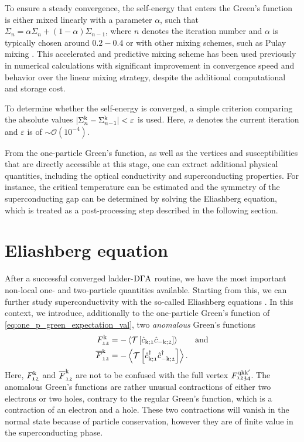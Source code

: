 \documentclass[../../main.tex]{subfiles}
\begin{document}
To ensure a steady convergence, the self-energy that enters the Green's function is either mixed linearly with a parameter $\alpha$, such that $\Sigma_n=\alpha\Sigma_n + (1-\alpha)\Sigma_{n-1}$, where $n$ denotes the iteration number and $\alpha$ is typically chosen around $0.2-0.4$ or with other mixing schemes, such as Pulay mixing \cite{Banerjee2016}. This accelerated and predictive mixing scheme has been used previously in numerical calculations \cite{Peil2022} with significant improvement in convergence speed and behavior over the linear mixing strategy, despite the additional computational and storage cost. 

To determine whether the self-energy is converged, a simple criterion comparing the absolute values $|\Sigma_n^{\text{k}}-\Sigma_{n-1}^{\text{k}}|<\varepsilon$ is used. Here, $n$ denotes the current iteration and $\varepsilon$ is of $\sim\mathcal{O}\left (10^{-4}\right )$.

From the one-particle Green's function, as well as the vertices and susceptibilities that are directly accessible at this stage, one can extract additional physical quantities, including the optical conductivity and superconducting properties. For instance, the critical temperature can be estimated and the symmetry of the superconducting gap can be determined by solving the Eliashberg equation, which is treated as a post-processing step described in the following section.

\section{Eliashberg equation}

After a successful converged ladder-$\text{D}\Gamma\text{A}$ routine, we have the most important non-local one- and two-particle quantities available. Starting from this, we can further study superconductivity with the so-called Eliashberg equations \cite{Eliashberg1960, Marsiglio2020}. In this context, we introduce, additionally to the one-particle Green's function of \eqref{eq:one_p_green_expectation_val}, two \textit{anomalous} Green's functions \cite{Kaser2022}
\begin{subequations}
\begin{align}
	F_{\mathfrak{12}}^{\text{k}}&=-\left\langle \mathcal{T}\left [\hat{c}_{\text{k};\mathfrak{1}}\hat{c}_{-\text{k};\mathfrak{2}}\right ]\right\rangle \qquad\text{and}\\
	\overline{F}_{\mathfrak{12}}^{\text{k}}&=-\left\langle \mathcal{T}\left [\hat{c}^{\dagger}_{\text{k};\mathfrak{1}}\hat{c}^{\dagger}_{-\text{k};\mathfrak{2}}\right ]\right\rangle.
\end{align}
\end{subequations}
Here, $F_{\mathfrak{12}}^{\text{k}}$ and $\overline{F}_{\mathfrak{12}}^{\text{k}}$ are not to be confused with the full vertex $F^{\text{q}\text{k}\text{k}'}_{\mathfrak{1234}}$. The anomalous Green's functions are rather unusual contractions of either two electrons or two holes, contrary to the regular Green's function, which is a contraction of an electron and a hole. These two contractions will vanish in the normal state because of particle conservation, however they are of finite value in the superconducting phase. 
\end{document}
